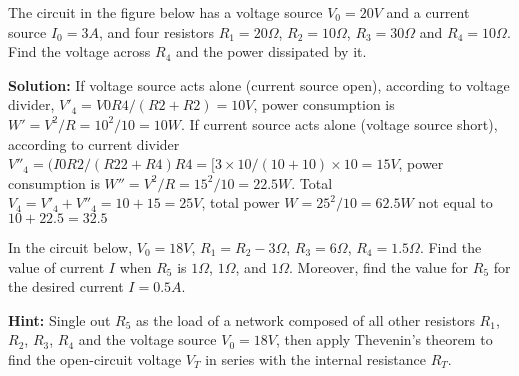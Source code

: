 

\item The circuit in the figure below has a voltage source $V_0=20V$ and a 
current source $I_0=3A$, and four resistors $R_1=20\Omega$, $R_2=10\Omega$, 
$R_3=30\Omega$ and $R_4=10\Omega$. Find the voltage across $R_4$ and the 
power dissipated by it.


{\bf Solution:}
If voltage source acts alone (current source open), according to voltage 
divider, $V'_4=V0 R4/(R2+R2)=10V$, power consumption is $W'=V^2/R=10^2/10=10W$.
If current source acts alone (voltage source short), according to current 
divider $V''_4=(I0 R2/(R22+R4) R4=[3\times 10/(10+10)\times 10=15V$, power 
consumption is $W''=V^2/R=15^2/10=22.5W$. Total $V_4=V'_4+V''_4=10+15=25V$, 
total power $W=25^2/10=62.5W$ not equal to $10+22.5=32.5$



\item In the circuit below, $V_0=18V$, $R_1=R_2-3\Omega$, $R_3=6\Omega$,
$R_4=1.5\Omega$. Find the value of current $I$ when $R_5$ is $1\Omega$,
$1\Omega$, and $1\Omega$. Moreover, find the value for $R_5$ for the
desired current $I=0.5A$.

{\bf Hint:} Single out $R_5$ as the load of a network composed of all other
resistors $R_1$, $R_2$, $R_3$, $R_4$ and the voltage source $V_0=18V$, then
apply Thevenin's theorem to find the open-circuit voltage $V_T$ in series
with the internal resistance $R_T$.




